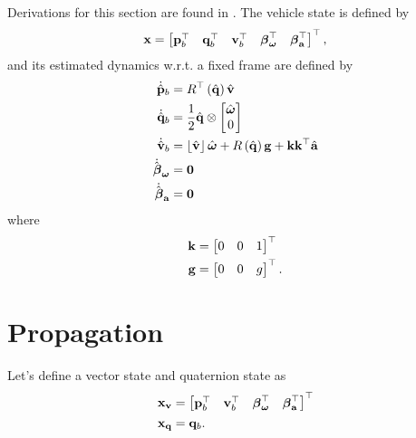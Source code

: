 \documentclass[english]{article}
\begin{document}
Derivations for this section are found in \cite{key-2}. The vehicle state is defined by
\begin{equation}
{\bf x}=\begin{bmatrix}{\bf p}_{b}^{\top} & {\bf q}_{b}^{\top} & {\bf v}_{b}^{\top} & \boldsymbol{\beta}_{\boldsymbol{\omega}}^{\top} & \boldsymbol{\beta}_{{\bf a}}^{\top}\end{bmatrix}^{\top},
\end{equation}
and its estimated dynamics w.r.t. a fixed frame are defined by
\begin{align}
\dot{\hat{{\bf p}}}_b & =R^{\top}\left(\hat{{\bf q}}\right)\hat{{\bf v}}\\
\dot{\hat{{\bf q}}}_b & =\dfrac{1}{2}\hat{{\bf q}}\otimes\begin{bmatrix}\hat{\boldsymbol{\omega}}\\0\end{bmatrix}\\
\dot{\hat{{\bf v}}}_b & =\left\lfloor \hat{{\bf v}}\right\rfloor \hat{\boldsymbol{\omega}}+R\left(\hat{{\bf q}}\right){\bf g}+{\bf k}{\bf k}^{\top}\hat{{\bf a}}\\
\dot{\hat{\boldsymbol{\beta}}}_{\boldsymbol{\omega}} & ={\bf 0}\\
\dot{\hat{\boldsymbol{\beta}}}_{{\bf a}} & ={\bf 0}
\end{align}
where
\begin{align}
{\bf k} & = \begin{bmatrix} 0 & 0 & 1 \end{bmatrix}^{\top}\\
{\bf g} & = \begin{bmatrix} 0 & 0 & g \end{bmatrix}^{\top}.
\end{align}



\section{Propagation}

Let's define a vector state and quaternion state as
\begin{align}
{\bf x}_{\bf v} & = \begin{bmatrix}{\bf p}_{b}^{\top} & {\bf v}_{b}^{\top} & \boldsymbol{\beta}_{\boldsymbol{\omega}}^{\top} & \boldsymbol{\beta}_{{\bf a}}^{\top}\end{bmatrix}^{\top} \\
{\bf x}_{\bf q} & = {\bf q}_{b}.
\end{align}
\end{document}
